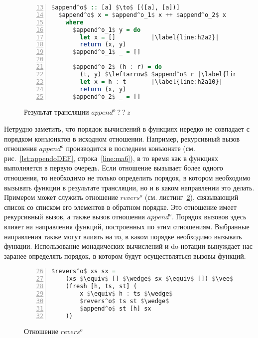 \documentclass[conference,a4paper,american,russian]{IEEEtran}
\begin{document}
\begin{figure}[h!]
  \begin{center}
  \begin{minipage}{0.4\textwidth}
    \begin{lstlisting}[language=Haskell, frame=single, numbers=left, numberstyle=\small, firstnumber=13, escapechar=|]
  $append^o$ :: [a] $\to$ [([a], [a])]
  $append^o$ x = $append^o_1$ x ++ $append^o_2$ x
    where
      $append^o_1$ y = do
        let x = []          |\label{line:h2a2}|
        return (x, y)
      $append^o_1$ _ = []
      
      $append^o_2$ (h : r) = do
        (t, y) $\leftarrow$ $append^o$ r |\label{line:h2a9}|
        let x = h : t       |\label{line:h2a10}|
        return (x, y)
      $append^o_2$ _ = []
      \end{lstlisting}
  \end{minipage}
  \end{center}
  \caption{Результат трансляции $append^o \ ? \ ? \ z$ }
  \label{lst:appendoBWD}
\end{figure}

Нетрудно заметить, что порядок вычислений в функциях нередко не совпадает с порядком конъюнктов в исходном отношении. 
Например, рекурсивный вызов отношения $append^o$ производится в последнем конъюнкте (см. рис.~\ref{lst:appendoDEF}, строка~\ref{line:ma6}), в то время как в функциях выполняется в первую очередь. 
Если отношение вызывает более одного отношения, то необходимо не только определить порядок, в котором необходимо вызывать функции в результате трансляции, но и в каком направлении это делать. 
Примером может служить отношение $revers^o$ (см. листинг~\ref{lst:reversoDEF}), связывающий список со списком его элементов в обратном порядке.
Это отношение имеет рекурсивный вызов, а также вызов отношения $append^o$. 
Порядок вызовов здесь влияет на направления функций, построенных по этим отношениям.
Выбранные направления также могут влиять на то, в каком порядке необходимо вызывать функции. 
Использование монадических вычислений и do-нотации вынуждает нас заранее определять порядок, в котором будут осуществляться вызовы функций. 

\begin{figure}[h!]
  \begin{center}
  \begin{minipage}{0.35\textwidth}
  \begin{lstlisting}[language=Haskell, frame=single, numbers=left,numberstyle=\small, firstnumber=26,escapechar=|]
  $revers^o$ xs sx =
    (xs $\equiv$ [] $\wedge$ sx $\equiv$ []) $\vee$
    (fresh [h, ts, st] (
        x $\equiv$ h : ts $\wedge$
        $revers^o$ ts st $\wedge$
        $append^o$ st [h] sx
    ))
    \end{lstlisting}
  \end{minipage}
  \end{center}
  \caption{Отношение $revers^o$}
  \label{lst:reversoDEF}
\end{figure}
\end{document}
